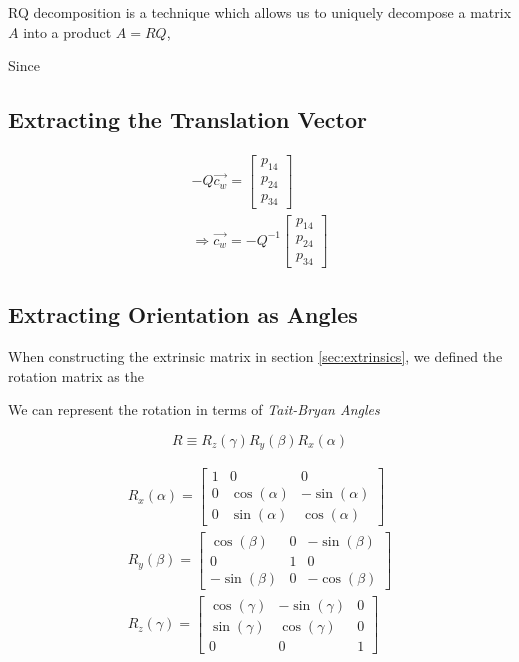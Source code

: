 RQ decomposition is a technique which allows us to uniquely decompose a matrix $A$ into a product $A=RQ$,

Since

\subsection{Extracting the Translation Vector}

\begin{gather}
    -Q\vec{c_w} =
    \begin{bmatrix}
        p_{14} \\ p_{24} \\ p_{34}
    \end{bmatrix} \nonumber \\
    \Rightarrow \vec{c_w} = -Q^{-1}
    \begin{bmatrix}
        p_{14} \\ p_{24} \\ p_{34}
    \end{bmatrix}
\end{gather}




\subsection{Extracting Orientation as Angles}

When constructing the extrinsic matrix in section \ref{sec:extrinsics}, we defined the rotation matrix as the

We can represent the rotation in terms of \emph{Tait-Bryan Angles}

\begin{equation}
    R \equiv R_z(\gamma)R_y(\beta)R_x(\alpha)
\end{equation}

\begin{subequations}
    \begin{gather}
        R_x(\alpha) =
        \begin{bmatrix}
            1 & 0            & 0             \\
            0 & \cos(\alpha) & -\sin(\alpha) \\
            0 & \sin(\alpha) & \cos(\alpha)
        \end{bmatrix} \\
        R_y(\beta) =
        \begin{bmatrix}
            \cos(\beta)  & 0 & -\sin(\beta) \\
            0            & 1 & 0            \\
            -\sin(\beta) & 0 & -\cos(\beta)
        \end{bmatrix} \\
        R_z(\gamma) =
        \begin{bmatrix}
            \cos(\gamma) & -\sin(\gamma) & 0 \\
            \sin(\gamma) & \cos(\gamma)  & 0 \\
            0            & 0             & 1
        \end{bmatrix}
    \end{gather}
\end{subequations}


